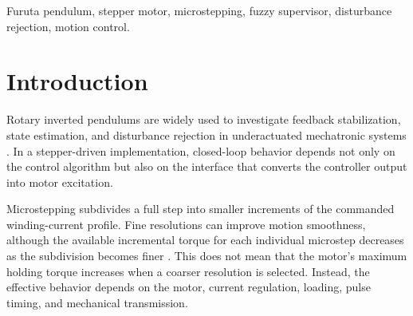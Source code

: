 \documentclass[conference]{IEEEtran}
\begin{document}
\begin{abstract}
This paper investigates adaptive microstepping for a stepper-driven Furuta pendulum, aiming to reconcile smooth motion during nominal stabilization with recovery from external disturbances. The experimental platform employs a discrete-time linear quadratic regulator (LQR) and a reduced-order state observer, while a fuzzy supervisor adjusts the motor microstepping resolution according to pendulum angular deviation and estimated angular velocity. A zero-order Sugeno rule base selects among five microstepping resolutions, from 1/16 to 1/256. Because the step-pulse rate is bounded, each resolution imposes a ceiling on the commanded arm velocity, which is lowest for the finest subdivision. In a single experimental session comparing the adaptive scheme with five fixed resolutions, the fixed 1/256 and 1/128 configurations lost balance after impulsive disturbances once the velocity command saturated at that ceiling, whereas fixed 1/32 and 1/16 operation retained balance during nominal operation but increased the steady-state RMS pendulum deviation from $0.16^\circ$ (1/256) to $0.39^\circ$ and $0.79^\circ$, respectively. The adaptive configuration recovered from both applied disturbances while keeping a steady-state RMS deviation of $0.17^\circ$. These results are preliminary; repeated trials with controlled disturbance magnitude are still required to quantify the trade-off statistically.
\end{abstract}

\begin{IEEEkeywords}
Furuta pendulum, stepper motor, microstepping, fuzzy supervisor, disturbance rejection, motion control.
\end{IEEEkeywords}

\section{Introduction}
Rotary inverted pendulums are widely used to investigate feedback stabilization, state estimation, and disturbance rejection in underactuated mechatronic systems \cite{akhtaruzzaman2010}. In a stepper-driven implementation, closed-loop behavior depends not only on the control algorithm but also on the interface that converts the controller output into motor excitation.

Microstepping subdivides a full step into smaller increments of the commanded winding-current profile. Fine resolutions can improve motion smoothness, although the available incremental torque for each individual microstep decreases as the subdivision becomes finer \cite{ti2021}. This does not mean that the motor's maximum holding torque increases when a coarser resolution is selected. Instead, the effective behavior depends on the motor, current regulation, loading, pulse timing, and mechanical transmission.
\end{document}
